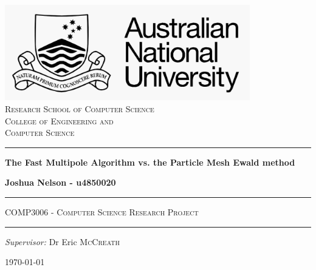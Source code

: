 \documentclass[pdftex,twoside,a4paper]{report}
\begin{document}
\begin{titlepage}
 
\begin{center}

\includegraphics[width=0.8\textwidth]{logoWhite.png}\\[0.5cm]
\textsc{\Large Research School of Computer Science}\\[0.5cm]
\textsc{\Large College of Engineering and}\\[0.2cm]
\textsc{\Large Computer Science}\\[0.5cm]


 
\vspace{1.4cm}

\hrule

\vspace{1.4cm}

{ \huge \bfseries The Fast Multipole Algorithm vs. the Particle Mesh Ewald method} \\

\vspace{0.4cm}

{ \LARGE \bfseries Joshua Nelson - u4850020} \\

\vspace{1.4cm}


\hrule

\vspace{1.0cm}

\textsc{\large COMP3006 - Computer Science Research Project}\\

\vspace{1.0cm}

\hrule

\vspace{1.4cm}



\emph{Supervisor: } 
Dr Eric \textsc{McCreath} \\

 
\vfill
 
{\large \today}
 
\end{center}
 
\end{titlepage}
\end{document}
